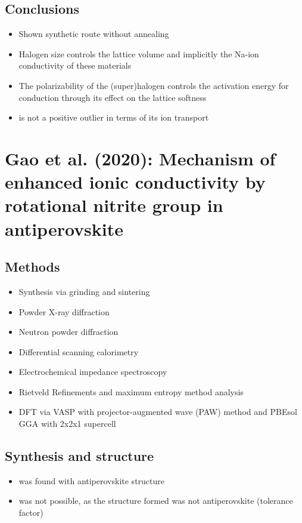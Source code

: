\documentclass[10pt,a4paper, titlepage]{article}
\begin{document}
\subsection{Conclusions}

\begin{itemize}
  \item Shown synthetic route without annealing
  \item Halogen size controls the lattice volume and implicitly the Na-ion conductivity of these materials
  \item The polarizability of the (super)halogen controls the activation energy for conduction through its effect on the lattice softness
  \item {} is not a positive outlier in terms of its ion transport
\end{itemize}

\section{Gao et al. (2020): Mechanism of enhanced ionic conductivity by
rotational nitrite group in antiperovskite }

\subsection{Methods}

\begin{itemize}
  \item Synthesis via grinding and sintering
  \item Powder X-ray diffraction
  \item Neutron powder diffraction
  \item Differential scanning calorimetry
  \item Electrochemical impedance spectroscopy
  \item Rietveld Refinements and maximum entropy method
analysis
  \item DFT via VASP with projector-augmented wave (PAW) method and PBEsol GGA with 2x2x1 supercell
\end{itemize}

\subsection{Synthesis and structure}

\begin{itemize}
  \item {} was found with antiperovskite structure
  \item {} was not possible, as the structure formed was not antiperovskite (tolerance factor)
\end{itemize}
\end{document}
